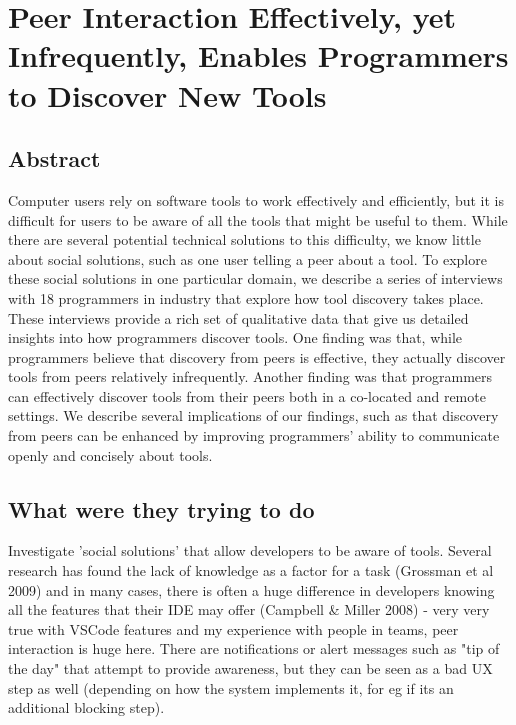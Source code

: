 \section{Peer Interaction Effectively, yet Infrequently, Enables Programmers to Discover New Tools}

\subsection{Abstract}

Computer users rely on software tools to work effectively and efficiently, but it is difficult for users to be aware of all the tools that might be useful to them. While there are several potential technical solutions to this difficulty, we know little about social solutions, such as one user telling a peer about a tool. To explore these social solutions in one particular domain, we describe a series of interviews with 18 programmers in industry that explore how tool discovery takes place. These interviews provide a rich set of qualitative data that give us detailed insights into how programmers discover tools. One finding was that, while programmers believe that discovery from peers is effective, they actually discover tools from peers relatively infrequently. Another finding was that programmers can effectively discover tools from their peers both in a co-located and remote settings. We describe several implications of our findings, such as that discovery from peers can be enhanced by improving programmers’ ability to communicate openly and concisely about tools.

\subsection{What were they trying to do}

Investigate 'social solutions' that allow developers to be aware of tools. Several research has found the lack of knowledge as a factor for a task (Grossman et al 2009) \cite{grossmanSurveySoftwareLearnability2009} and in many cases, there is often a huge difference in developers knowing all the features that their IDE may offer (Campbell \& Miller 2008) \cite{campbellDesigningRefactoringTools2008} - very very true with VSCode features and my experience with people in teams, peer interaction is huge here. There are notifications or alert messages such as "tip of the day" that attempt to provide awareness, but they can be seen as a bad UX step as well (depending on how the system implements it, for eg if its an additional blocking step).

